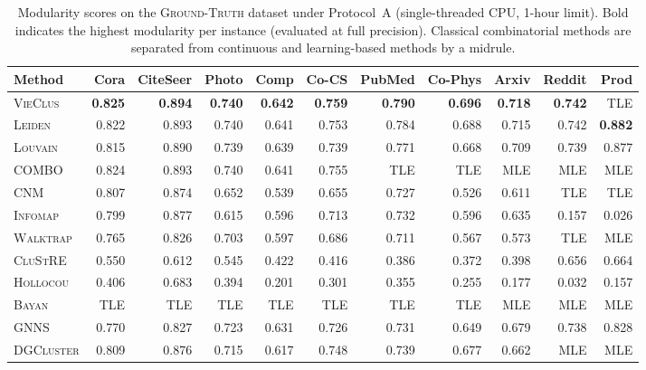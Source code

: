 \documentclass[11pt,a4paper]{article}
\begin{document}
\begin{table}[H]
    \centering
    \caption{Modularity scores on the \textsc{Ground-Truth} dataset under Protocol~A (single-threaded CPU, 1-hour limit). Bold indicates the highest modularity per instance (evaluated at full precision). Classical combinatorial methods are separated from continuous and learning-based methods by a midrule.}
    \label{tab:mod_gt}
    \vspace{0.5em}
    \small
    \setlength{\tabcolsep}{3.5pt}
    \begin{tabular*}{\textwidth}{@{\extracolsep{\fill}}l rrrrrrrrrr@{}}
        \toprule
        Method & Cora & CiteSeer & Photo & Comp & Co-CS & PubMed & Co-Phys & Arxiv & Reddit & Prod \\
        \midrule
        \textsc{VieClus} & \textbf{0.825} & \textbf{0.894} & \textbf{0.740} & \textbf{0.642} & \textbf{0.759} & \textbf{0.790} & \textbf{0.696} & \textbf{0.718} & \textbf{0.742} & TLE \\
        \textsc{Leiden} & 0.822 & 0.893 & 0.740 & 0.641 & 0.753 & 0.784 & 0.688 & 0.715 & 0.742 & \textbf{0.882} \\
        \textsc{Louvain} & 0.815 & 0.890 & 0.739 & 0.639 & 0.739 & 0.771 & 0.668 & 0.709 & 0.739 & 0.877 \\
        \textsc{COMBO} & 0.824 & 0.893 & 0.740 & 0.641 & 0.755 & TLE & TLE & MLE & MLE & MLE \\
        \textsc{CNM} & 0.807 & 0.874 & 0.652 & 0.539 & 0.655 & 0.727 & 0.526 & 0.611 & TLE & TLE \\
        \textsc{Infomap} & 0.799 & 0.877 & 0.615 & 0.596 & 0.713 & 0.732 & 0.596 & 0.635 & 0.157 & 0.026 \\
        \textsc{Walktrap} & 0.765 & 0.826 & 0.703 & 0.597 & 0.686 & 0.711 & 0.567 & 0.573 & TLE & MLE \\
        \textsc{CluStRE} & 0.550 & 0.612 & 0.545 & 0.422 & 0.416 & 0.386 & 0.372 & 0.398 & 0.656 & 0.664 \\
        \textsc{Hollocou} & 0.406 & 0.683 & 0.394 & 0.201 & 0.301 & 0.355 & 0.255 & 0.177 & 0.032 & 0.157 \\
        \textsc{Bayan} & TLE & TLE & TLE & TLE & TLE & TLE & TLE & MLE & MLE & MLE \\
        \midrule
        \textsc{GNNS} & 0.770 & 0.827 & 0.723 & 0.631 & 0.726 & 0.731 & 0.649 & 0.679 & 0.738 & 0.828 \\
        \textsc{DGCluster} & 0.809 & 0.876 & 0.715 & 0.617 & 0.748 & 0.739 & 0.677 & 0.662 & MLE & MLE \\

\end{tabular*}
\end{table}
\end{document}
